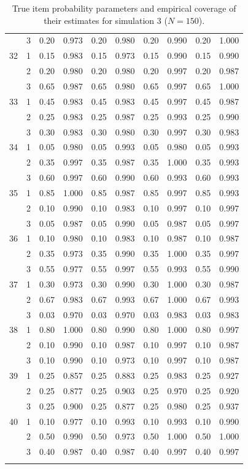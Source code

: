 \begin{longtable}{llcccccccc}
   & 3 & 0.20 & 0.973 & 0.20 & 0.980 & 0.20 & 0.990 & 0.20 & 1.000 \\ 
  32 & 1 & 0.15 & 0.983 & 0.15 & 0.973 & 0.15 & 0.990 & 0.15 & 0.990 \\ 
   & 2 & 0.20 & 0.980 & 0.20 & 0.980 & 0.20 & 0.997 & 0.20 & 0.987 \\ 
   & 3 & 0.65 & 0.987 & 0.65 & 0.980 & 0.65 & 0.997 & 0.65 & 1.000 \\ 
  33 & 1 & 0.45 & 0.983 & 0.45 & 0.983 & 0.45 & 0.997 & 0.45 & 0.987 \\ 
   & 2 & 0.25 & 0.983 & 0.25 & 0.987 & 0.25 & 0.993 & 0.25 & 0.990 \\ 
   & 3 & 0.30 & 0.983 & 0.30 & 0.980 & 0.30 & 0.997 & 0.30 & 0.983 \\ 
  34 & 1 & 0.05 & 0.980 & 0.05 & 0.993 & 0.05 & 0.980 & 0.05 & 0.993 \\ 
   & 2 & 0.35 & 0.997 & 0.35 & 0.987 & 0.35 & 1.000 & 0.35 & 0.993 \\ 
   & 3 & 0.60 & 0.997 & 0.60 & 0.990 & 0.60 & 0.993 & 0.60 & 0.993 \\ 
  35 & 1 & 0.85 & 1.000 & 0.85 & 0.987 & 0.85 & 0.997 & 0.85 & 0.993 \\ 
   & 2 & 0.10 & 0.990 & 0.10 & 0.983 & 0.10 & 0.997 & 0.10 & 0.997 \\ 
   & 3 & 0.05 & 0.987 & 0.05 & 0.990 & 0.05 & 0.987 & 0.05 & 0.997 \\ 
  36 & 1 & 0.10 & 0.980 & 0.10 & 0.983 & 0.10 & 0.987 & 0.10 & 0.987 \\ 
   & 2 & 0.35 & 0.973 & 0.35 & 0.990 & 0.35 & 1.000 & 0.35 & 0.997 \\ 
   & 3 & 0.55 & 0.977 & 0.55 & 0.997 & 0.55 & 0.993 & 0.55 & 0.990 \\ 
  37 & 1 & 0.30 & 0.973 & 0.30 & 0.990 & 0.30 & 1.000 & 0.30 & 0.987 \\ 
   & 2 & 0.67 & 0.983 & 0.67 & 0.993 & 0.67 & 1.000 & 0.67 & 0.993 \\ 
   & 3 & 0.03 & 0.970 & 0.03 & 0.970 & 0.03 & 0.983 & 0.03 & 0.983 \\ 
  38 & 1 & 0.80 & 1.000 & 0.80 & 0.990 & 0.80 & 1.000 & 0.80 & 0.997 \\ 
   & 2 & 0.10 & 0.990 & 0.10 & 0.987 & 0.10 & 0.997 & 0.10 & 0.987 \\ 
   & 3 & 0.10 & 0.990 & 0.10 & 0.973 & 0.10 & 0.997 & 0.10 & 0.987 \\ 
  39 & 1 & 0.25 & 0.857 & 0.25 & 0.883 & 0.25 & 0.983 & 0.25 & 0.927 \\ 
   & 2 & 0.25 & 0.877 & 0.25 & 0.903 & 0.25 & 0.970 & 0.25 & 0.920 \\ 
   & 3 & 0.25 & 0.900 & 0.25 & 0.877 & 0.25 & 0.980 & 0.25 & 0.937 \\ 
  40 & 1 & 0.10 & 0.977 & 0.10 & 0.993 & 0.10 & 0.993 & 0.10 & 0.990 \\ 
   & 2 & 0.50 & 0.990 & 0.50 & 0.973 & 0.50 & 1.000 & 0.50 & 1.000 \\ 
   & 3 & 0.40 & 0.987 & 0.40 & 0.987 & 0.40 & 0.997 & 0.40 & 0.997 \\ 
   \bottomrule
\caption{True item probability parameters and empirical coverage of their estimates for simulation 3 ($N = 150$).} 
\label{table:sim3_item_prob_coverage_N150}
\end{longtable}
